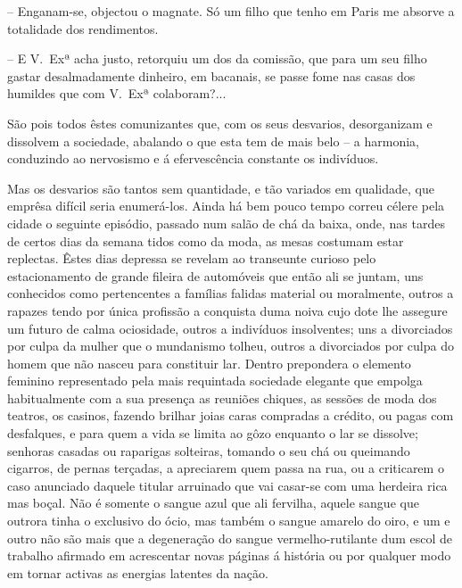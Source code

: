 \documentclass[9pt]{article}
\begin{document}
-- Enganam-se, objectou o magnate. Só um fi\-lho que tenho em Paris me
absorve a totalidade dos rendimentos.

-- E V.\ Exª acha justo, retorquiu um dos da comissão, que para um seu fi\-lho gastar desalmadamente dinheiro, em bacanais, se passe fome nas casas dos
humildes que com V.\ Exª colaboram?...

São pois todos êstes comunizantes que, com os seus desvarios, desorganizam e dissolvem a sociedade, abalando o que esta tem de mais belo -- a harmonia, conduzindo ao nervosismo e á efervescência constante os indivíduos.

Mas os desvarios são tantos sem quantidade, e tão variados em qualidade,
que emprêsa difícil seria enumerá-los. Ainda há bem pouco tempo correu célere pela cidade o seguinte episódio, passado num salão de chá da baixa,
onde, nas tardes de certos dias da semana tidos como da moda, as mesas costumam
estar replectas. Êstes dias depressa se revelam ao transeunte curioso pelo
estacionamento de gran\-de fileira de automóveis que então ali se juntam, uns
conhecidos como pertencentes a fa\-mí\-lias falidas material ou moralmente, outros a rapazes tendo por única profissão a conquista duma noiva cujo dote
\-lhe assegure um futuro de calma ociosidade, outros a indivíduos insolventes;
uns a divorciados por culpa da mu\-lher que o mundanismo to\-lheu, outros a divorciados por culpa do homem que não nasceu para constituir lar. Dentro
prepondera o elemento feminino representado pela mais requintada sociedade
elegante que empolga habitualmente com a sua presença as reuniões chiques,
as sessões de moda dos teatros, os casinos, fazendo bri\-lhar joias caras compradas a crédito, ou pagas com desfalques, e para quem a vida se limita ao
gôzo enquanto o lar se dissolve; senhoras casadas ou raparigas solteiras,
tomando o seu chá ou queimando cigarros, de pernas terçadas, a apreciarem
quem passa na rua, ou a criticarem o caso anunciado daquele titular arruinado que vai casar-se com uma herdeira rica mas boçal. Não é somente o sangue
azul que ali fervi\-lha, aquele sangue que outrora tinha o exclusivo do ócio,
mas também o sangue amarelo do oiro, e um e outro não são mais que a degenera\-ção do sangue verme\-lho-rutilante dum escol de traba\-lho afirmado em acrescentar novas páginas á his\-tó\-ria ou por qualquer modo em tornar activas as
energias latentes da na\-ção.
\end{document}
